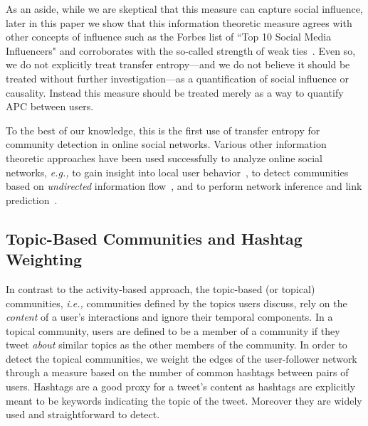 \documentclass[10pt,letterpaper]{article}
\begin{document}
As an aside, while we are skeptical that this measure can capture social influence, later in this paper we show that this information theoretic measure agrees with other concepts of influence such as the Forbes list of ``Top 10 Social Media Influencers" and corroborates with the so-called strength of weak ties~\cite{granovetter1973strength}. Even so, we do not explicitly treat transfer entropy---and we do not believe it should be treated without further investigation---as a quantification of social influence or causality. Instead this measure should be treated merely as a way to quantify APC between users.%

To the best of our knowledge, this is the first use of transfer entropy for community detection in online social networks. Various other information theoretic approaches have been used successfully to analyze online social networks, \emph{e.g.,} to gain insight into local user behavior~\cite{darmon2013understanding}, to detect communities based on \emph{undirected} information flow~\cite{darmon2013detecting}, and to perform network inference and link prediction~\cite{ver2012information}.




\subsection{Topic-Based Communities and Hashtag Weighting}
\label{sec:method-topic}

In contrast to the activity-based approach, the topic-based (or topical) communities, \emph{i.e.,} communities defined by the topics users discuss, rely on the \emph{content} of a user's interactions and ignore their temporal components. In a topical community, users are defined to be a member of a community if they tweet \emph{about} similar topics as the other members of the community. 
In order to detect the topical communities, we weight the edges of the user-follower network through a measure based on the number of common hashtags between pairs of users. Hashtags are a good proxy for a tweet's content as hashtags are explicitly meant to be keywords indicating the topic of the tweet. Moreover they are widely used and straightforward to detect. 
\end{document}
